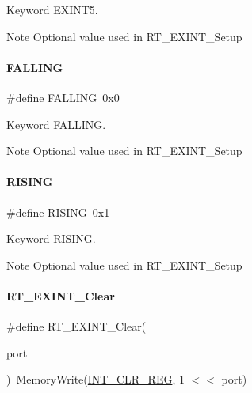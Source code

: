 Keyword E\+X\+I\+N\+T5. 

\begin{DoxyNote}{Note}
Optional value used in R\+T\+\_\+\+E\+X\+I\+N\+T\+\_\+\+Setup 
\end{DoxyNote}
\mbox{\label{a00011_ac00eb6fc2047dc399280f31b0c5f4472}} 
\paragraph{\texorpdfstring{F\+A\+L\+L\+I\+NG}{FALLING}}
{\footnotesize\ttfamily \#define F\+A\+L\+L\+I\+NG~0x0}



Keyword F\+A\+L\+L\+I\+NG. 

\begin{DoxyNote}{Note}
Optional value used in R\+T\+\_\+\+E\+X\+I\+N\+T\+\_\+\+Setup 
\end{DoxyNote}
\mbox{\label{a00011_aeea2b49478f3b13faedba764985c6e96}} 
\paragraph{\texorpdfstring{R\+I\+S\+I\+NG}{RISING}}
{\footnotesize\ttfamily \#define R\+I\+S\+I\+NG~0x1}



Keyword R\+I\+S\+I\+NG. 

\begin{DoxyNote}{Note}
Optional value used in R\+T\+\_\+\+E\+X\+I\+N\+T\+\_\+\+Setup 
\end{DoxyNote}
\mbox{\label{a00011_a1bebef46f3eb19ed0c71deb174a4bbaf}} 
\paragraph{\texorpdfstring{R\+T\+\_\+\+E\+X\+I\+N\+T\+\_\+\+Clear}{RT\_EXINT\_Clear}}
{\footnotesize\ttfamily \#define R\+T\+\_\+\+E\+X\+I\+N\+T\+\_\+\+Clear(\begin{DoxyParamCaption}\item[{}]{port }\end{DoxyParamCaption})~Memory\+Write(\mbox{\hyperlink{a00020_a3db4a185cd2de3411b6de2dfee71a009}{I\+N\+T\+\_\+\+C\+L\+R\+\_\+\+R\+EG}}, 1 $<$$<$ port)}



